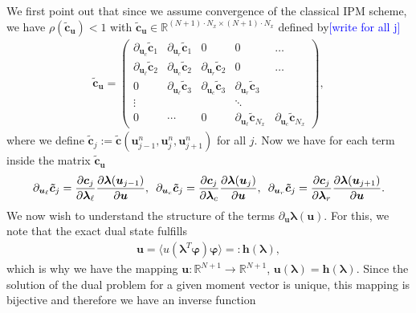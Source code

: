 \documentclass[10pt, a4paper, titlepage, bibliography=totocnumbered]{article}
\newenvironment{proof}[1][Proof]{\begin{trivlist}
\item[\hskip \labelsep {\bfseries #1}]}{\end{trivlist}}
\begin{document}
\begin{proof}
We first point out that since we assume convergence of the classical IPM scheme, we have $\rho (\bm{\tilde c}_{\bm{u}})<1$ with $\bm{\tilde c}_{\bm{u}}\in\mathbb{R}^{(N+1)\cdot N_x\times (N+1)\cdot N_x}$ defined by\textcolor{blue}{[write for all j]}
\begin{align*}
\bm{\tilde c}_{\bm{u}} = 
\begin{pmatrix} 
    \partial_{\bm{u}_c}\bm{\tilde c}_{1} & \partial_{\bm{u}_r}\bm{\tilde c}_{1}& 0 & 0 & \dots \\
    \partial_{\bm{u}_{\ell}}\bm{\tilde c}_{2} & \partial_{\bm{u}_c}\bm{\tilde c}_{2} & \partial_{\bm{u}_r}\bm{\tilde c}_{2}& 0 & \dots \\
    0 & \partial_{\bm{u}_{\ell}}\bm{\tilde c}_{3} & \partial_{\bm{u}_c}\bm{\tilde c}_{3} & \partial_{\bm{u}_r}\bm{\tilde c}_{3}\\
    \vdots & & & \ddots & \\
    0 &\cdots &  0 & \partial_{\bm{u}_{\ell}}\bm{\tilde c}_{N_x} & \partial_{\bm{u}_c}\bm{\tilde c}_{N_x}
    \end{pmatrix},
\end{align*}
where we define $\bm{\tilde c}_{j}:=\bm{\tilde c}\left(\bm{u}_{j-1}^n,\bm{u}_{j}^n,\bm{u}_{j+1}^n\right)$ for all $j$. Now we have for each term inside the matrix $\bm{\tilde c}_{\bm{u}}$
\begin{align*}
\partial_{\bm{u}_{\ell}}\bm{\tilde c}_{j} = \frac{\partial \bm{c}_j}{\partial \bm{\lambda}_{\ell}}\frac{\partial \bm{\lambda}(\bm{u}_{j-1})}{\partial \bm{u}},\enskip\partial_{\bm{u}_c}\bm{\tilde c}_{j} = \frac{\partial \bm{c}_j}{\partial \bm{\lambda}_c}\frac{\partial \bm{\lambda}(\bm{u}_j)}{\partial \bm{u}},\enskip\partial_{\bm{u}_r}\bm{\tilde c}_{j} = \frac{\partial \bm{c}_j}{\partial \bm{\lambda}_r}\frac{\partial \bm{\lambda}(\bm{u}_{j+1})}{\partial \bm{u}}.
\end{align*}
We now wish to understand the structure of the terms $\partial_{\bm{u}} \bm{\lambda}(\bm{u})$. For this, we note that the exact dual state fulfills
\begin{align}\label{eq:ulambda}
\bm{u} = \langle u(\bm{\lambda}^T\bm{\varphi})\bm{\varphi}\rangle =: \bm{h}(\bm{\lambda}),
\end{align}
which is why we have the mapping $\bm{u}:\mathbb{R}^{N+1}\to\mathbb{R}^{N+1}$, $\bm{u}(\bm{\lambda}) = \bm{h}(\bm{\lambda})$. Since the solution of the dual problem for a given moment vector is unique, this mapping is bijective and therefore we have an inverse function

\end{proof}
\end{document}
